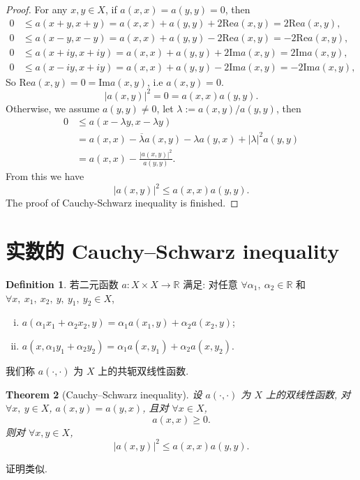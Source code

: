 \documentclass[a4paper,12pt]{article}
\newtheorem{theorem}{Theorem}[section]
\theoremstyle{definition}
\newtheorem{definition}[theorem]{Definition}
\begin{document}
\begin{proof}
    For any $  x, y \in X $, if $ a(x, x) = a(y, y) = 0 $, then
    \begin{align*}
        0 &\leq a(x + y, x + y) = a(x, x) + a(y, y) + 2 \text{Re} a(x, y) = 2 \text{Re} a(x, y), \\
        0 &\leq a(x - y, x - y) = a(x, x) + a(y, y) - 2 \text{Re} a(x, y) = - 2 \text{Re} a(x, y), \\
        0 &\leq a(x + iy, x + iy) = a(x, x) + a(y, y) + 2 \text{Im} a(x, y) = 2 \text{Im} a(x, y), \\
        0 &\leq a(x - iy, x + iy) = a(x, x) + a(y, y) - 2 \text{Im} a(x, y) = - 2 \text{Im} a(x, y),
    \end{align*}
    So $ \text{Re} a(x, y) = 0 = \text{Im} a(x, y) $, i.e $ a(x, y) = 0 $. 
    $$ 
        |a(x, y)|^2 = 0 = a(x, x) a(y, y).
    $$
    Otherwise, we assume $ a(y, y) \neq 0 $, let $ \lambda := a(x, y) / a(y, y) $, then
    \begin{align*}
        0 &\leq a(x - \lambda y, x - \lambda y)\\
          &= a(x, x) - \overline{\lambda} a(x, y) - \lambda a(y, x) + |\lambda|^2 a(y, y) \\
          &= a(x, x) - \frac{|a(x, y)|^2}{a(y, y)}.
    \end{align*}
    From this we have
    $$ 
        |a(x, y)|^2 \leq a(x, x) a(y, y).
    $$
    The proof of Cauchy-Schwarz inequality is finished.
\end{proof}

\section{实数的 Cauchy–Schwarz inequality}

\begin{definition}
    若二元函数 $ a: X \times X \to \mathbb{R} $ 满足: 
    对任意 $ \forall \alpha_1,\ \alpha_2 \in \mathbb{R} $ 和 $ \forall x,\ x_1,\ x_2,\ y,\ y_1,\ y_2 \in X $,
    \begin{enumerate}[(i)]
        \item $ a(\alpha_1 x_1 + \alpha_2 x_2, y) = \alpha_1 a(x_1, y) + \alpha_2 a(x_2, y) $;
        \item $ a(x, \alpha_1 y_1 + \alpha_2 y_2) = \alpha_1 a(x, y_1) + \alpha_2 a(x, y_2) $.
    \end{enumerate}
    我们称 $ a(\cdot, \cdot) $ 为 $ X $ 上的共轭双线性函数.
\end{definition}

\begin{theorem}[Cauchy–Schwarz inequality]
    设 $ a(\cdot, \cdot) $ 为 $ X $ 上的双线性函数, 对 $ \forall x,\ y \in X $,
    $ a(x, y) = a(y, x) $, 且对 $ \forall x \in X $,
    $$
        a(x, x) \geq 0.
    $$
    则对 $ \forall x, y \in X $,
    $$
        |a(x, y)|^2 \leq a(x, x) a(y, y).
    $$
\end{theorem}

证明类似.
\end{document}
